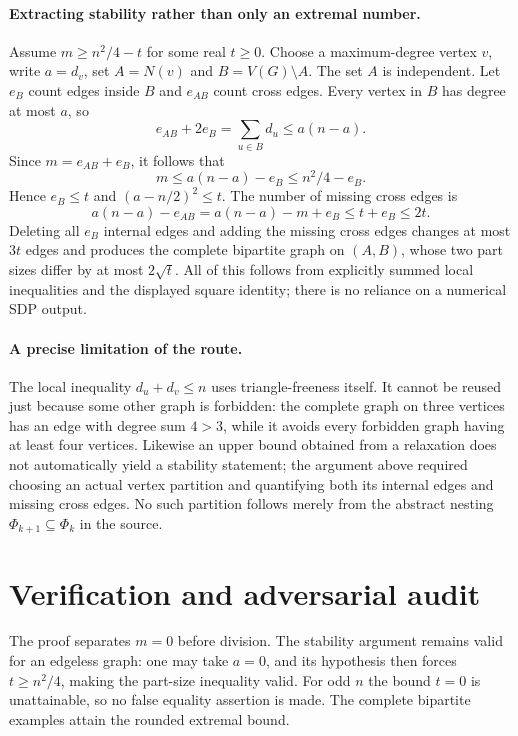 \documentclass[11pt]{article}
\begin{document}
\paragraph{Extracting stability rather than only an extremal number.}
Assume $m\geq n^2/4-t$ for some real $t\geq0$. Choose a maximum-degree
vertex $v$, write $a=d_v$, set $A=N(v)$ and $B=V(G)\setminus A$.
The set $A$ is independent. Let $e_B$ count edges inside $B$ and $e_{AB}$
count cross edges. Every vertex in $B$ has degree at most $a$, so
\[
 e_{AB}+2e_B=\sum_{u\in B}d_u\leq a(n-a).
\]
Since $m=e_{AB}+e_B$, it follows that
\[
 m\leq a(n-a)-e_B\leq n^2/4-e_B.
\]
Hence $e_B\leq t$ and $(a-n/2)^2\leq t$.
The number of missing cross edges is
\[
 a(n-a)-e_{AB}=a(n-a)-m+e_B\leq t+e_B\leq2t.
\]
Deleting all $e_B$ internal edges and adding the missing cross edges changes
at most $3t$ edges and produces the complete bipartite graph on $(A,B)$,
whose two part sizes differ by at most $2\sqrt t$.
All of this follows from explicitly summed local inequalities and the displayed
square identity; there is no reliance on a numerical SDP output.

\paragraph{A precise limitation of the route.}
The local inequality $d_u+d_v\leq n$ uses triangle-freeness itself. It cannot
be reused just because some other graph is forbidden: the complete graph on
three vertices has an edge with degree sum $4>3$, while it avoids every
forbidden graph having at least four vertices. Likewise an upper bound obtained
from a relaxation does not automatically yield a stability statement; the
argument above required choosing an actual vertex partition and quantifying
both its internal edges and missing cross edges. No such partition follows
merely from the abstract nesting $\Phi_{k+1}\subseteq\Phi_k$ in the source.

\section{Verification and adversarial audit}

The proof separates $m=0$ before division. The stability argument remains valid
for an edgeless graph: one may take $a=0$, and its hypothesis then forces
$t\geq n^2/4$, making the part-size inequality valid. For odd $n$ the bound
$t=0$ is unattainable, so no false equality assertion is made. The complete
bipartite examples attain the rounded extremal bound.
\end{document}
